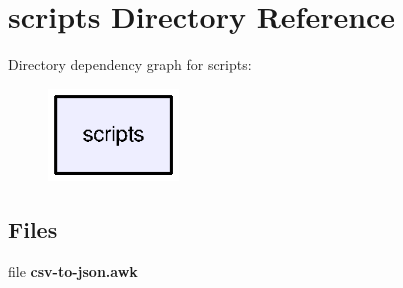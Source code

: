 \section{scripts Directory Reference}
\label{dir_53e6fa9553ac22a5646d2a2b2d7b97a1}
Directory dependency graph for scripts\+:\nopagebreak
\begin{figure}[H]
\begin{center}
\leavevmode
\includegraphics[width=98pt]{dir_53e6fa9553ac22a5646d2a2b2d7b97a1_dep}
\end{center}
\end{figure}
\subsection*{Files}
\begin{DoxyCompactItemize}
\item 
file {\bfseries csv-\/to-\/json.\+awk}
\end{DoxyCompactItemize}
